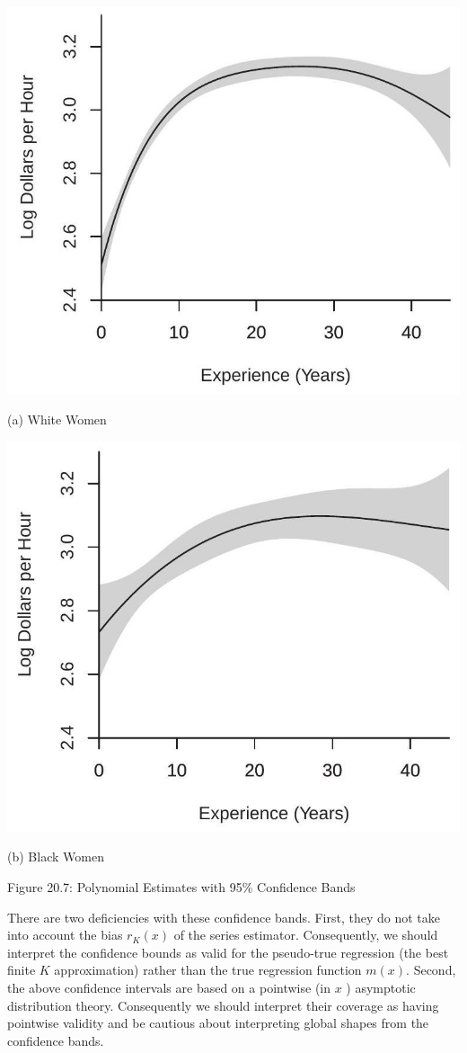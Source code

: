 \documentclass[10pt]{article}
\begin{document}
\includegraphics[max width=\textwidth]{2022_10_23_2b38d6d54e7725c196e7g-22}

(a) White Women

\includegraphics[max width=\textwidth]{2022_10_23_2b38d6d54e7725c196e7g-22(1)}

(b) Black Women

Figure 20.7: Polynomial Estimates with 95\% Confidence Bands

There are two deficiencies with these confidence bands. First, they do not take into account the bias $r_{K}(x)$ of the series estimator. Consequently, we should interpret the confidence bounds as valid for the pseudo-true regression (the best finite $K$ approximation) rather than the true regression function $m(x)$. Second, the above confidence intervals are based on a pointwise (in $x$ ) asymptotic distribution theory. Consequently we should interpret their coverage as having pointwise validity and be cautious about interpreting global shapes from the confidence bands.
\end{document}
